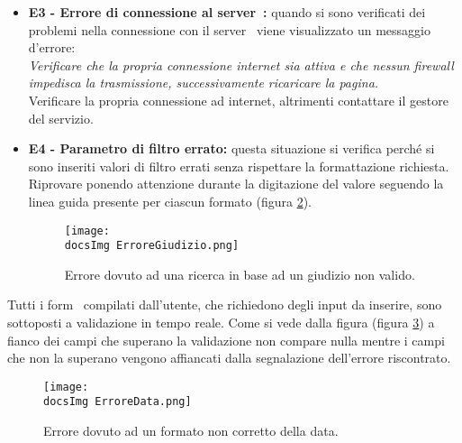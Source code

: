 {\begin{itemize}
\begin{center}
\begin{figure}[h!]
	\centering
	\texttt{[image: \\docsImg ErroreLogin2.png]}
	\caption{Errore di login dovuto a username o password inesistenti.}
	\label{fig:LoginErr2}
\end{figure}
\end{center}

	\item \textbf{E3 - Errore di connessione al server\g~: }{
		quando si sono verificati dei problemi nella connessione con il server\g~ viene visualizzato un messaggio d'errore:\\
		\textit{Verificare che la propria connessione internet sia attiva e che nessun firewall\g~ impedisca la trasmissione, successivamente ricaricare la pagina.}\\
		Verificare la propria connessione ad internet, altrimenti contattare il gestore del servizio.
	}

	\item \textbf{E4 - Parametro di filtro errato: }{
		questa situazione si verifica perché si sono inseriti valori di filtro errati senza rispettare la formattazione richiesta.\\
		Riprovare ponendo attenzione durante la digitazione del valore seguendo la linea guida presente per ciascun formato (figura \ref{fig:GiudizioErr}).
	}

\begin{center}
\begin{figure}[h!]
	\centering
	\texttt{[image: \\docsImg ErroreGiudizio.png]}
	\caption{Errore dovuto ad una ricerca in base ad un giudizio non valido.}
	\label{fig:GiudizioErr}
\end{figure}
\end{center}

\end{itemize}

Tutti i form\g~ compilati dall'utente, che richiedono degli input da inserire, sono sottoposti a validazione in tempo reale. Come si vede dalla figura (figura \ref{fig:DataErr}) a fianco dei campi che superano la validazione non compare nulla mentre i campi che non la superano vengono affiancati dalla segnalazione dell'errore riscontrato.


\begin{center}
\begin{figure}[h!]
	\centering
	\texttt{[image: \\docsImg ErroreData.png]}
	\caption{Errore dovuto ad un formato non corretto della data.}
	\label{fig:DataErr}
\end{figure}
\end{center}



}
